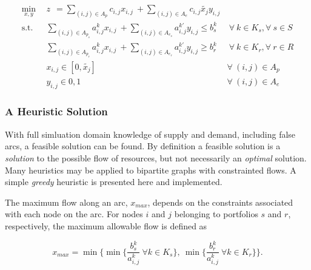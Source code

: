 \begin{subequations}\label{eqs:NFCTP_simp}
  \begin{align}
    \min_{x, y} \:\: 
    & 
    z \:\: = 
    \sum_{(i, j) \in A_p} c_{i,j} x_{i,j} 
    \: + 
    \sum_{(i, j) \in A_e} c_{i,j} \tilde{x_j} y_{i,j} 
    & 
    \label{eqs:NFCTP_simp_obj} \\
    \text{s.t.} \:\: 
    &
    \sum_{(i, j) \in A_{p_s}} a^k_{i,j} x_{i,j}
    \: + 
    \sum_{(i, j) \in A_{e_s}} a^{k\prime}_{i,j} y_{i,j}
    \leq b^k_s 
    &
    \: 
    \forall \: k \in K_s, 
    \forall \: s \in S 
    \label{eqs:NFCTP_simp_sup} \\
    &
    \sum_{(i, j) \in A_{p_r}} a^k_{i,j} x_{i,j}
    \: + 
    \sum_{(i, j) \in A_{e_r}} a^{k\prime}_{i,j} y_{i,j}
    \geq b^k_r 
    &
    \: 
    \forall \: k \in K_r,  
    \forall \: r \in R 
    \label{eqs:NFCTP_simp_req} \\
    &
    x_{i,j} \in [0, \tilde{x_j}]
    &
    \forall \: (i, j) \in A_p
    \label{eqs:NFCTP_simp_x} \\
    &
    y_{i,j} \in {0, 1}
    &
    \forall \: (i, j) \in A_e
    \label{eqs:NFCTP_simp_y}
  \end{align}
\end{subequations}

\subsubsection{A Heuristic Solution}\label{abm:dre:nfctp:heur}

With full simluation domain knowledge of supply and demand, including false
arcs, a feasible solution can be found. By definition a feasible solution is a
\textit{solution} to the possible flow of resources, but not necessarily an
\textit{optimal} solution. Many heuristics may be applied to bipartite graphs
with constrainted flows. A simple \textit{greedy} heuristic is presented here
and implemented. 

The maximum flow along an arc, $x_{max}$, depends on the constraints associated
with each node on the arc. For nodes $i$ and $j$ belonging to portfolios $s$ and
$r$, respectively, the maximum allowable flow is defined as

\begin{equation}
  x_{max} = \min 
        \lbrace 
        \min \lbrace \frac{b^k_s}{a^k_{i, j}} 
        \: \forall k \in K_s \rbrace, 
        \: \min \lbrace \frac{b^k_r}{a^k_{i, j}} 
        \: \forall k \in K_r \rbrace
        \rbrace.
\end{equation}

